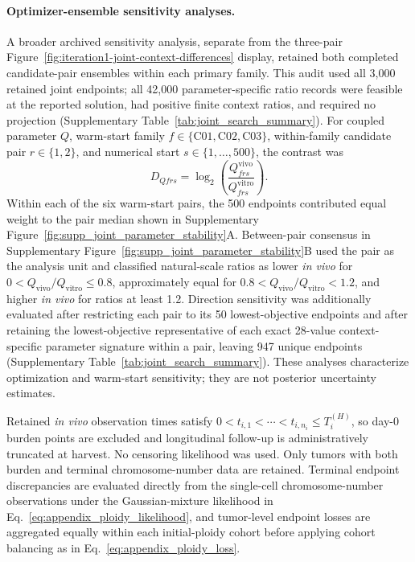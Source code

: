 \documentclass[11pt]{article}
\begin{document}
\paragraph{Optimizer-ensemble sensitivity analyses.}
A broader archived sensitivity analysis, separate from the three-pair Figure~\ref{fig:iteration1-joint-context-differences} display, retained both completed candidate-pair ensembles within each primary family. This audit used all 3,000 retained joint endpoints; all 42,000 parameter-specific ratio records were feasible at the reported solution, had positive finite context ratios, and required no projection (Supplementary Table~\ref{tab:joint_search_summary}). For coupled parameter $Q$, warm-start family $f\in\{\mathrm{C01},\mathrm{C02},\mathrm{C03}\}$, within-family candidate pair $r\in\{1,2\}$, and numerical start $s\in\{1,\ldots,500\}$, the contrast was
\begin{equation}
D_{Qfrs}=\log_2\!\left(\frac{Q^{\mathrm{vivo}}_{frs}}{Q^{\mathrm{vitro}}_{frs}}\right).
\label{eq:appendix_joint_family_log2_ratio}
\end{equation}
Within each of the six warm-start pairs, the 500 endpoints contributed equal weight to the pair median shown in Supplementary Figure~\ref{fig:supp_joint_parameter_stability}A. Between-pair consensus in Supplementary Figure~\ref{fig:supp_joint_parameter_stability}B used the pair as the analysis unit and classified natural-scale ratios as lower \textit{in vivo} for $0<Q_{\mathrm{vivo}}/Q_{\mathrm{vitro}}\leq0.8$, approximately equal for $0.8<Q_{\mathrm{vivo}}/Q_{\mathrm{vitro}}<1.2$, and higher \textit{in vivo} for ratios at least 1.2. Direction sensitivity was additionally evaluated after restricting each pair to its 50 lowest-objective endpoints and after retaining the lowest-objective representative of each exact 28-value context-specific parameter signature within a pair, leaving 947 unique endpoints (Supplementary Table~\ref{tab:joint_search_summary}). These analyses characterize optimization and warm-start sensitivity; they are not posterior uncertainty estimates.

Retained \textit{in vivo} observation times satisfy $0<t_{i,1}<\cdots<t_{i,n_i}\le T_i^{(H)}$, so day-0 burden points are excluded and longitudinal follow-up is administratively truncated at harvest. No censoring likelihood was used. Only tumors with both burden and terminal chromosome-number data are retained. Terminal endpoint discrepancies are evaluated directly from the single-cell chromosome-number observations under the Gaussian-mixture likelihood in Eq.~\eqref{eq:appendix_ploidy_likelihood}, and tumor-level endpoint losses are aggregated equally within each initial-ploidy cohort before applying cohort balancing as in Eq.~\eqref{eq:appendix_ploidy_loss}.
\end{document}
